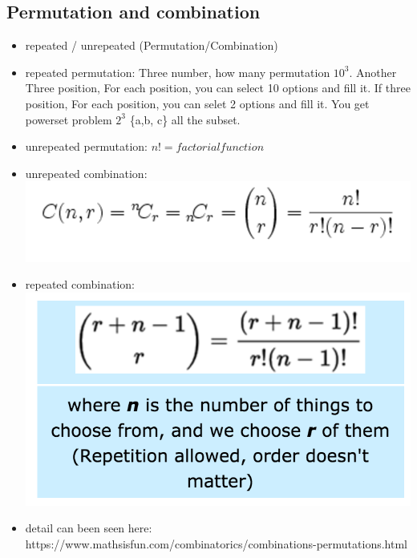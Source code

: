 \documentclass[a4paper,12pt,twoside]{book}
\begin{document}
\subsection{Permutation and combination}
\begin{itemize}
\item repeated / unrepeated (Permutation/Combination)

\item repeated permutation: Three number, how many permutation $10^3$. Another Three position, For each position, you can select 10 options and fill it.  If three position, For each position, you can selet 2 options and fill it. You get powerset problem $2^3$ \{a,b, c\} all the subset. 

\item unrepeated permutation: $n! = factorial function$
\item unrepeated combination:  
\includegraphics[scale=0.6]{pics/UC.png} \newline
\item repeated combination: 
\includegraphics[scale=0.6]{pics/RC.png} \newline
\item detail can been seen here: https://www.mathsisfun.com/combinatorics/combinations-permutations.html

\end{itemize}
\end{document}
